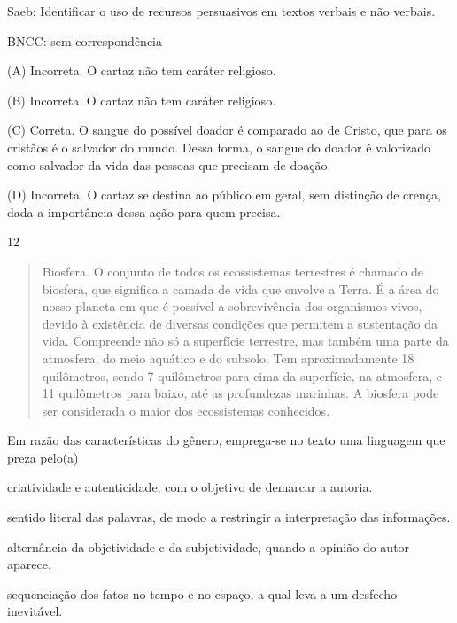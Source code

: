 Saeb: Identificar o uso de recursos persuasivos em textos verbais e não
verbais.

BNCC: sem correspondência

(A) Incorreta. O cartaz não tem caráter religioso.

(B) Incorreta. O cartaz não tem caráter religioso.

(C) Correta. O sangue do possível doador é comparado ao de Cristo, que
para os cristãos é o salvador do mundo. Dessa forma, o sangue do doador
é valorizado como salvador da vida das pessoas que precisam de doação.

(D) Incorreta. O cartaz se destina ao público em geral, sem distinção de
crença, dada a importância dessa ação para quem precisa.

\num{12}

\begin{quote}
Biosfera. O conjunto de todos os ecossistemas terrestres é chamado de
biosfera, que significa a camada de vida que envolve a Terra. É a área
do nosso planeta em que é possível a sobrevivência dos organismos vivos,
devido à existência de diversas condições que permitem a sustentação da
vida. Compreende não só a superfície terrestre, mas também uma parte da
atmosfera, do meio aquático e do subsolo. Tem aproximadamente 18
quilômetros, sendo 7 quilômetros para cima da superfície, na atmosfera,
e 11 quilômetros para baixo, até as profundezas marinhas. A biosfera
pode ser considerada o maior dos ecossistemas conhecidos.
\end{quote}


Em razão das características do gênero, emprega-se no texto uma
linguagem que preza pelo(a)

\begin{escolha}
\item criatividade e autenticidade, com o objetivo de demarcar a autoria.

\item sentido literal das palavras, de modo a restringir a interpretação
das informações.

\item alternância da objetividade e da subjetividade, quando a opinião do
autor aparece.

\item sequenciação dos fatos no tempo e no espaço, a qual leva a um
desfecho inevitável.
\end{escolha}

